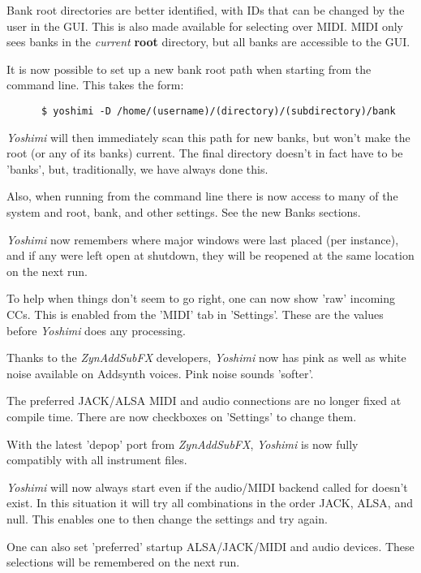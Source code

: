 \documentclass[
 11pt,
 twoside,
 a4paper,
 final                                 %
]{article}
\begin{document}
   Bank root directories are better identified, with IDs that can be changed by
   the user in the GUI. This is also made available for selecting over MIDI.
   MIDI only sees banks in the \textsl{current}
   \textbf{root} directory, but all banks are accessible to the GUI.

   It is now possible to set up a new bank root path when starting from the
   command line. This takes the form:

   \begin{verbatim}
      $ yoshimi -D /home/(username)/(directory)/(subdirectory)/bank
   \end{verbatim}

   \textsl{Yoshimi} will then immediately scan this path for new banks, but
   won't make the root (or any of its banks) current. The final directory
   doesn't in fact have to be 'banks', but, traditionally, we have always done
   this.

   Also, when running from the command line there is now access to many of the
   system and root, bank, and other settings.
   See the new Banks sections.

   \textsl{Yoshimi} now remembers where major windows were last placed (per
   instance), and if any were left open at shutdown, they will be reopened at
   the same location on the next run.

   To help when things don't seem to go right, one can now show 'raw' incoming
   CCs. This is enabled from the 'MIDI' tab in 'Settings'. These are the values
   before \textsl{Yoshimi} does any processing.

   Thanks to the \textsl{ZynAddSubFX} developers, \textsl{Yoshimi} now has pink
   as well as white noise available on Addsynth voices. Pink noise sounds
   'softer'.

   The preferred JACK/ALSA MIDI and audio connections are no longer fixed at
   compile time. There are now checkboxes on 'Settings' to change them.

   With the latest 'depop' port from \textsl{ZynAddSubFX}, \textsl{Yoshimi}
   is now fully compatibly with all instrument files.

   \textsl{Yoshimi} will now always start even if the audio/MIDI backend called
   for doesn't exist. In this situation it will try all combinations in the
   order JACK, ALSA, and null. This enables one to then change the settings and
   try again.

   One can also set 'preferred' startup ALSA/JACK/MIDI and audio devices.
   These selections will be remembered on the next run.
\end{document}
